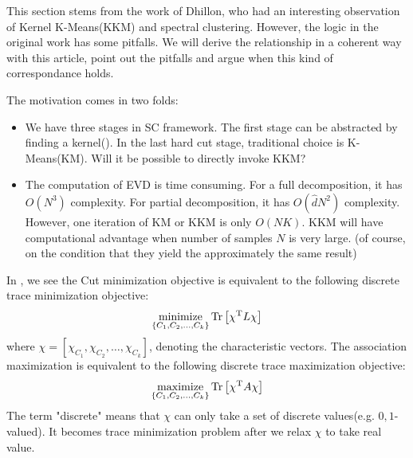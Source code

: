 This section stems from the work of Dhillon\cite{dhillon2004unified}, 
who had an interesting observation of Kernel K-Means(KKM) and spectral 
clustering. However, the logic in the original work has some pitfalls. 
We will derive the relationship in a coherent way with this article, 
point out the pitfalls and argue when this kind of correspondance holds. 

The motivation comes in two folds:
\begin{itemize}
	\item We have three stages in SC framework. The first stage
	can be abstracted by finding a kernel(\rsec{\ref{sec:kfx}}). 
	In the last hard cut stage, traditional choice is K-Means(KM). 
	Will it be possible to directly invoke KKM? 
	\item The computation of EVD is time consuming. For a full 
	decomposition, it has $ O(N^3) $ complexity. For partial 
	decomposition, it  has $ O(\hat{d}N^2) $ complexity. 
	However, one iteration of KM or KKM is only $ O(NK) $. 
	KKM will have computational advantage when number of 
	samples $ N $ is very large. (of course, on the condition 
	that they yield the approximately the same result)
\end{itemize}

In \rsec{\ref{sec:combinatoric}}, we see the Cut minimization 
objective is equivalent to the following discrete trace minimization 
objective:
\begin{equation}
    \operatorname*{minimize}_{\{C_1, C_2, \ldots, C_k\}}{ \mathrm{Tr}\left[ \chi^\mathrm{T} L \chi \right] }
    \label{eq:cut_trmin}
\end{equation}
where $ \chi = [\chi_{C_1}, \chi_{C_2}, \ldots , \chi_{C_k}] $, 
denoting the characteristic vectors.
The association maximization is equivalent to the following 
discrete trace maximization objective:
\begin{equation}
	\operatorname*{maximize}_{\{C_1, C_2, \ldots, C_k\}}{ \mathrm{Tr}\left[ \chi^\mathrm{T} A \chi \right] }
	\label{eq:assoc_trmax}
\end{equation}
The term "discrete" means that $ \chi $ can only take 
a set of discrete values(e.g. $ 0,1 $-valued). 
It becomes trace minimization problem after we relax $ \chi $
to take real value. 

